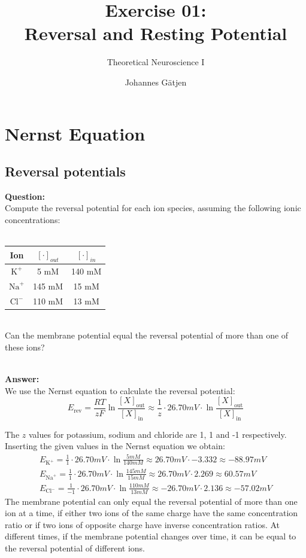 \documentclass{scrartcl}
\title{Exercise 01:\\Reversal and Resting Potential}
\subtitle{Theoretical Neuroscience I}
\author{Johannes G\"atjen}
\newcommand\Answer{%
  \textbf{\\Answer:}%
}
\newcommand\Question{%
  \textbf{Question:}%
}
\begin{document}
\maketitle

\section{Nernst Equation}
\subsection{Reversal potentials}

\Question\\
Compute the reversal potential for each ion species, assuming the following ionic concentrations:\\
\\
\begin{tabular}{c | c c}
Ion & $[\cdot]_{out}$ & $[\cdot]_{in}$ \\ \hline
$\text{K}^+$ & 5 mM & 140 mM \\
$\text{Na}^+$ & 145 mM & 15 mM \\
$\text{Cl}^-$ & 110 mM & 13 mM
\end{tabular}\\
Can the membrane potential equal the reversal potential of more than one of these ions?

\Answer\\
We use the Nernst equation to calculate the reversal potential:
\begin{equation*}
E_{\text{rev}}=\frac{RT}{zF}\ln \frac{[X]_{\text{out}}}{[X]_{\text{in}}} \approx \frac{1}{z} \cdot 26.70 \si{mV} \cdot \ln \frac{[X]_{\text{out}}}{[X]_{\text{in}}}
\end{equation*}

The $z$ values for potassium, sodium and chloride are 1, 1 and -1 respectively. Inserting the given values in the Nernst equation we obtain:
\begin{equation*}
\begin{split}
E_{\text{K}^+}=\frac{1}{1} \cdot 26.70 \si{mV} \cdot \ln \frac{5 \si{mM}}{140 \si{mM}} \approx 26.70 \si{mV} \cdot -3.332 \approx -88.97 \si{mV}\\
E_{\text{Na}^+}=\frac{1}{1} \cdot 26.70 \si{mV} \cdot \ln \frac{145 \si{mM}}{15 \si{mM}} \approx 26.70 \si{mV} \cdot 2.269 \approx 60.57 \si{mV}\\
E_{\text{Cl}^-}=\frac{1}{-1} \cdot 26.70 \si{mV} \cdot \ln \frac{110 \si{mM}}{13 \si{mM}} \approx {-26.70} \si{mV} \cdot 2.136 \approx -57.02 \si{mV}
\end{split}
\end{equation*}
The membrane potential can only equal the reversal potential of more than one ion at a time, if either two ions of the same charge have the same concentration ratio or if two ions of opposite charge have inverse concentration ratios. At different times, if the membrane potential changes over time, it can be equal to the reversal potential of different ions.
\pagebreak
\end{document}

